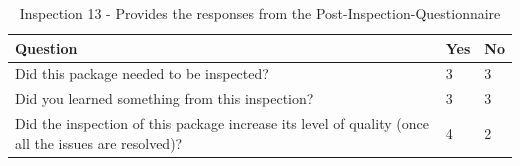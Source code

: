 \begin{table}[!h]
  \begin{center}
    \caption[Post Inspection 13 - Responses]{Inspection 13 - Provides the
      responses from the Post-Inspection-Questionnaire}
    \label{tab:post-inspection-questionnaire-results-13}
    \begin{tabular}{|p{8.0cm}|p{2.5cm}|p{2.5cm}|} \hline
{\bf Question} & {\bf Yes} & {\bf No} \\ \hline
Did this package needed to be inspected?  & 3 & 3 \\ \hline
Did you learned something from this inspection?  & 3 & 3 \\ \hline
Did the inspection of this package increase its level of quality (once all
the issues are resolved)? & 4 & 2 \\ \hline
    \end{tabular}
  \end{center}
\end{table}


